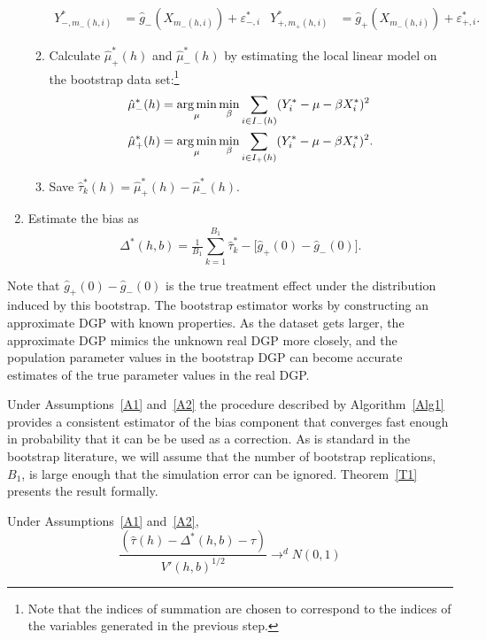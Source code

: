 \documentclass[12pt,fleqn]{article}
\begin{document}
\begin{algorithm}
\begin{enumerate}
\begin{enumerate}
      \begin{align*}
        Y_{-,m_-(h,i)}^* &= \hat g_-(X_{m_-(h,i)}) + \varepsilon_{-,i}^{*} &
        Y_{+,m_+(h,i)}^* &= \hat g_+(X_{m_-(h,i)}) + \varepsilon_{+,i}^{*}.
      \end{align*}
    \item Calculate $\hat\mu_+^*(h)$ and $\hat\mu_-^*(h)$ by estimating the
      local linear model on the bootstrap data set:\footnote{%
        Note that the indices of summation are chosen to correspond to the
        indices of the variables generated in the previous step.} %
      \begin{align*}
        \hat\mu_-^*(h)
        &= \argmin_{\mu} \min_{\beta} \ssum[-]{i}{h}
          (Y_i^* - \mu - \beta X_i^*)^2 \\
        \hat\mu_+^*(h)
        &= \argmin_{\mu} \min_{\beta} \ssum[+]{i}{h}
          (Y_i^* - \mu - \beta X_i^*)^2.
      \end{align*}
    \item Save $\hat\tau^*_k(h) = \hat\mu_+^*(h) - \hat\mu_-^*(h)$.
    \end{enumerate}
  \item Estimate the bias as
    \begin{equation*}
      \Delta^*(h,b) = \tfrac{1}{B_1} \sum_{k=1}^{B_1} \hat\tau^*_k -
      \big[\hat g_+(0) - \hat g_-(0)\big].
    \end{equation*}
  \end{enumerate}
\end{algorithm}
Note that $\hat g_+(0) - \hat g_-(0)$ is the true treatment effect under the
distribution induced by this bootstrap. The bootstrap estimator works by
constructing an approximate DGP with known properties. As the dataset gets
larger, the approximate DGP mimics the unknown real DGP more closely, and the
population parameter values in the bootstrap DGP can become accurate estimates
of the true parameter values in the real DGP.

Under Assumptions~\ref{A1} and~\ref{A2} the procedure described by
Algorithm~\ref{Alg1} provides a consistent estimator of the bias component that
converges fast enough in probability that it can be be used as a correction. As
is standard in the bootstrap literature, we will assume that the number of
bootstrap replications, $B_{1}$, is large enough that the simulation error can
be ignored. Theorem~\ref{T1} presents the result formally.

\begin{theorem}\label{T1}
  Under Assumptions~\ref{A1} and~\ref{A2},
\begin{equation}
  \label{eq:4}
  \frac{(\hat\tau(h) - \Delta^{*}(h,b) - \tau)}{ V'(h, b)^{1/2}}
  \to^{d} N(0,1)
\end{equation}
\end{theorem}
\end{document}
